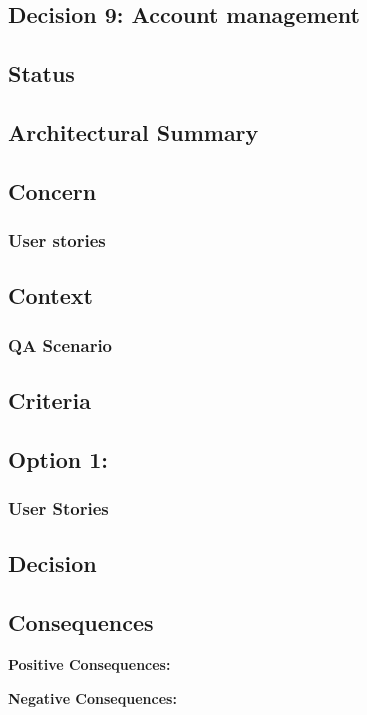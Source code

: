 \subsection{Decision 9: Account management}

\subsection*{Status}

\subsection*{Architectural Summary}


\subsection*{Concern}
\subsubsection*{User stories}

\subsection*{Context}
\subsubsection*{QA Scenario} %
\subsection*{Criteria}
\begin{itemize}
\end{itemize}

\subsection*{Option 1: }
\subsubsection*{User Stories}
\subsection*{Decision}
\subsection*{Consequences}
\textbf{Positive Consequences:}
\begin{itemize}
\end{itemize}
\textbf{Negative Consequences:}
\begin{itemize}
\end{itemize}